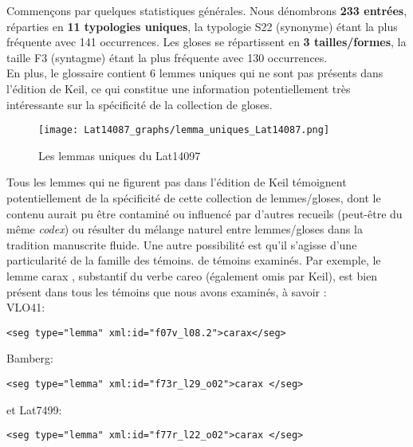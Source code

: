 \documentclass[a4paper, twoside, 12pt]{book}
\begin{document}
{Commençons par quelques statistiques générales. Nous dénombrons \textbf{233 entrées}, réparties en \textbf{11 typologies uniques}, la typologie S22 (synonyme) étant la plus fréquente avec 141 occurrences. Les gloses se répartissent en \textbf{3 tailles/formes}, la taille F3 (syntagme) étant la plus fréquente avec 130 occurrences.\\

En plus, le glossaire contient 6 lemmes uniques qui ne sont pas présents dans l'édition de Keil, ce qui constitue une information potentiellement très intéressante sur la spécificité de la collection de gloses.

\begin{figure}[H]
  \centering
  \texttt{[image: Lat14087\_graphs/lemma\_uniques\_Lat14087.png]}
  \caption{Les lemmas uniques du Lat14097}
  \label{fig:lemmasuniquesLat14097}
\end{figure}

Tous les lemmes qui ne figurent pas dans l'édition de Keil témoignent potentiellement de la spécificité de cette collection de lemmes/gloses, dont le contenu aurait pu être \og{} contaminé \fg{} ou influencé par d'autres recueils (peut-être du même \textit{codex}) ou résulter du mélange naturel entre lemmes/gloses dans la tradition manuscrite fluide. Une autre possibilité est qu'il s'agisse d'une particularité de la \og{}famille\fg{} des témoins. de témoins examinés. Par exemple, le lemme \og{} carax \fg{}, substantif du verbe \og{} careo \fg{} (également omis par Keil), est bien présent dans tous les témoins que nous avons examinés, à savoir : \\

VLO41:
\begin{verbatim}
<seg type="lemma" xml:id="f07v_l08.2">carax</seg>
\end{verbatim}

Bamberg:
\begin{verbatim}
<seg type="lemma" xml:id="f73r_l29_o02">carax </seg>
\end{verbatim}

et Lat7499:

\begin{verbatim}
<seg type="lemma" xml:id="f77r_l22_o02">carax </seg>
\end{verbatim} 

}
\end{document}
